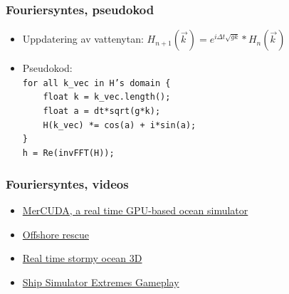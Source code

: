 \begin{frame}
\frametitle{Fouriersyntes, pseudokod}

\begin{itemize}[<+(1)->]
\item Uppdatering av vattenytan: $\displaystyle H_{n+1}(\vec{k\,}) = e^{i\Delta t\sqrt{gk}}*H_{n}(\vec{k\,})$
\item Pseudokod: \texttt{\\
for all k\_vec in H's domain \{         \\
\ \ \ \ float k = k\_vec.length();      \\
\ \ \ \ float a = dt*sqrt(g*k);         \\
\ \ \ \ H(k\_vec) *= cos(a) + i*sin(a); \\
\}                                      \\
h = Re(invFFT(H));                      \\
}
\end{itemize}


\end{frame}

\begin{frame}
\frametitle{Fouriersyntes, videos}

\begin{itemize}
\item \href{http://www.youtube.com/watch?v=sf6EVn2Zgk4}{MerCUDA, a real time GPU-based ocean simulator}
\item \href{http://www.youtube.com/watch?v=Lj_V5-bTvK0}{Offshore rescue}
\item \href{http://www.youtube.com/watch?v=3YW9WFwD-rI}{Real time stormy ocean 3D}
\item \href{http://www.youtube.com/watch?v=ocHyTiHEphg}{Ship Simulator Extremes Gameplay}
\end{itemize}

\end{frame}